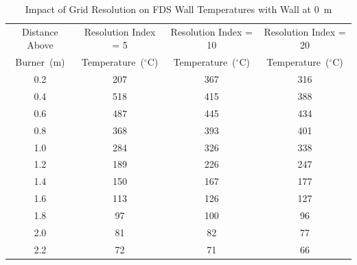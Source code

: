 \documentclass[twoside]{uocthesis}
\begin{document}
\begin{table}
	\small
	\centering
	\begin{tabular}{|c|c|c|c|}
		\hline Distance Above  & Resolution Index = 5      & Resolution Index = 10     & Resolution Index = 20 \\
		Burner~(m)	   & Temperature~($^{\circ}$C) & Temperature~($^{\circ}$C) & Temperature~($^{\circ}$C)	\\ \hline
		\hline 0.2 			   & 207					   & 367					& 316 			 	\\
		\hline 0.4			   & 518					   & 415					& 388			 	\\
		\hline 0.6			   & 487					   & 445					& 434			 	\\
		\hline 0.8			   & 368					   & 393					& 401				\\
		\hline 1.0			   & 284					   & 326 					& 338				\\
		\hline 1.2			   & 189					   & 226 					& 247				\\
		\hline 1.4			   & 150					   & 167 					& 177				\\
		\hline 1.6			   & 113					   & 126 					& 127				\\
		\hline 1.8			   & 97						   & 100 					& 96				\\
		\hline 2.0			   & 81						   & 82 					& 77				\\
		\hline 2.2			   & 72						   & 71 					& 66				\\
		\hline
	\end{tabular}
	\caption[Impact of Grid Resolution on FDS Wall Temperatures with Wall at 0~m]{Impact of Grid Resolution on FDS Wall Temperatures with Wall at 0~m}
	\label{tab:FDSRI_wall0D}
\end{table}
\end{document}
